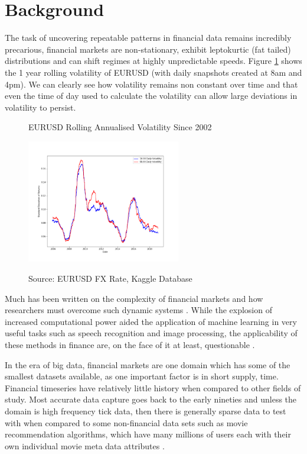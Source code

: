 \documentclass[11pt]{article}
\begin{document}
\section{Background}

The task of uncovering repeatable patterns in financial data remains incredibly precarious, financial markets are non-stationary, exhibit leptokurtic (fat tailed) distributions and can shift regimes at highly unpredictable speeds. Figure \ref{fig:eurvol} shows the 1 year rolling volatility of EURUSD (with daily snapshots created at 8am and 4pm). We can clearly see how volatility remains non constant over time and that even the time of day used to calculate the volatility can allow large deviations in volatility to persist.
\begin{figure}[h]
    \centering
  \caption{EURUSD Rolling Annualised Volatility Since 2002}

    \includegraphics[width=0.6\textwidth]{EURUSDRollingVol}
    \label{fig:eurvol}
\caption*{\small Source: EURUSD FX Rate, Kaggle Database}
\end{figure}
\newline
Much has been written on the complexity of financial markets and how researchers must overcome such dynamic systems \cite{Lebaron1994}. While the explosion of increased computational power aided the application of machine learning in very useful tasks such as speech recognition and image processing, the applicability of these methods in finance are, on the face of it at least, questionable \cite{Bailey2013}. 
\par
In the era of big data, financial markets are one domain which has some of the smallest datasets available, as one important factor is in short supply, time. Financial timeseries have relatively little history when compared to other fields of study. Most accurate data capture goes back to the early nineties and unless the domain is high frequency tick data, then there is generally sparse data to test with when compared to some non-financial data sets such as movie recommendation algorithms, which have many millions of users each with their own individual movie meta data attributes \cite{Portugal2018}. 
\end{document}
